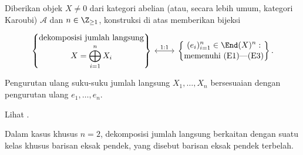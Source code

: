 \begin{proposisi}\label{prop:idempotent-decomposition}
	Diberikan objek $X\neq 0$ dari kategori abelian (atau, secara lebih umum,
	kategori Karoubi) $\mathcal{A}$ dan $n\in\Z_{\geq 1}$, konstruksi di atas
	memberikan bijeksi
	\[\begin{tikzcd}[row sep=small]
		\left\{\begin{gathered}
			\text{dekomposisi jumlah langsung}\\[-2pt]
			X = \bigoplus_{i=1}^n X_i
		\end{gathered}\right\}
		\arrow[leftrightarrow, r, "1:1"] &
		\left\{\begin{gathered}
			(e_i)_{i=1}^n \in \End(X)^n:\\[-2pt]
			\text{memenuhi (E1)---(E3)}
		\end{gathered}\right\}.
	\end{tikzcd}\]
	Pengurutan ulang suku-suku jumlah langsung $X_1,\ldots,X_n$ bersesuaian
	dengan pengurutan ulang $e_1,\ldots,e_n$.
\end{proposisi}
\begin{bukti}
	Lihat \cite[Proposisi 6.12.4]{Li1}.
\end{bukti}

Dalam kasus khusus $n=2$, dekomposisi jumlah langsung berkaitan dengan suatu
kelas khusus barisan eksak pendek, yang disebut barisan eksak pendek terbelah.

